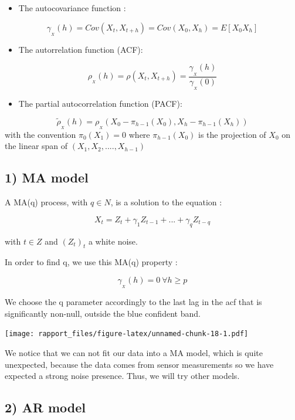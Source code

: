 \documentclass[]{article}
\providecommand{\tightlist}{%
  \setlength{\itemsep}{0pt}\setlength{\parskip}{0pt}}
\begin{document}
\begin{itemize}
\tightlist
\item
  The autocovariance function :
\end{itemize}

\[
\gamma_{_X}(h) = Cov(X_t, X_{t+h}) = Cov(X_0, X_h) = E[X_0X_h]
\]

\begin{itemize}
\tightlist
\item
  The autorrelation function (ACF):
\end{itemize}

\[
\rho_{_X}(h) = \rho(X_t, X_{t+h}) = \frac{\gamma_{_X}(h)}{\gamma_{_X}(0)}
\]

\begin{itemize}
\tightlist
\item
  The partial autocorrelation function (PACF):
\end{itemize}

\[
\tilde{\rho}_{_X}(h) = \rho_{_X}(X_0 - \pi_{h-1}(X_0), X_h - \pi_{h-1}(X_h))
\] with the convention \(\pi_0(X_1) = 0\) where \(\pi_{h-1}(X_0)\) is
the projection of \(X_0\) on the linear span of
\((X_1,X_2,....,X_{h-1})\)

\subsection{1) MA model}

A MA(q) process, with \(q \in N\), is a solution to the equation :

\[
X_t = Z_t + \gamma_1Z_{t-1} + ... + \gamma_qZ_{t-q}
\]

with \(t \in Z\) and \((Z_{t})_t\) a white noise.

In order to find q, we use this MA(q) property :

\[
\gamma_{_X}(h) = 0 \ \forall h \ge p
\]

We choose the q parameter accordingly to the last lag in the acf that is
significantly non-null, outside the blue confident band.

\texttt{[image: rapport\_files/figure-latex/unnamed-chunk-18-1.pdf]}

We notice that we can not fit our data into a MA model, which is quite
unexpected, because the data comes from sensor measurements so we have
expected a strong noise presence. Thus, we will try other models.

\subsection{2) AR model}
\end{document}
